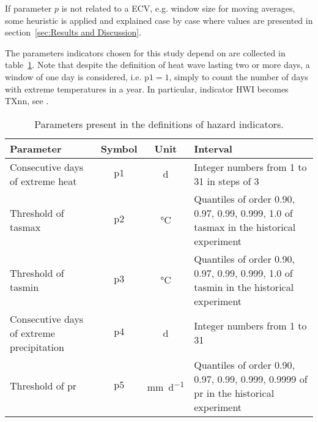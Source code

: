 If parameter $p$ is not related to a \gls{ECV}, e.g. window size for moving averages, some heuristic is applied and explained case by case where values are presented in section~\ref{sec:Results and Discussion}.

The parameters indicators chosen for this study depend on are collected in table~\ref{tab:indicators_parameters}. Note that despite the definition of heat wave lasting two or more days, a window of one day is considered, i.e. $\mathrm{p1} = 1$, simply to count the number of days with extreme temperatures in a year. In particular, indicator $\mathrm{HWI}$ becomes $\mathrm{TXnn}$, see \cite[2209]{2021GutierrezAnnexVI}.

\begin{table}[h]
  \renewcommand*{\arraystretch}{1.5}
  \centering
  \caption{Parameters present in the definitions of hazard indicators.}
  \label{tab:indicators_parameters}
  \begin{tabular}{p{}ccp{}}
    Parameter                                  & Symbol        & Unit                        & Interval                                                                                     \\
    \hline
    Consecutive days of extreme heat           & $\mathrm{p1}$ & \unit{\day}                 & Integer numbers from 1 to 31 in steps of 3                                                   \\  %
    Threshold of \gls{tasmax}                  & $\mathrm{p2}$ & \unit{\degreeCelsius}       & Quantiles of order 0.90, 0.97, 0.99, 0.999, 1.0 of \gls{tasmax} in the historical experiment \\
    Threshold of \gls{tasmin}                  & $\mathrm{p3}$ & \unit{\degreeCelsius}       & Quantiles of order 0.90, 0.97, 0.99, 0.999, 1.0 of \gls{tasmin} in the historical experiment \\
    Consecutive days of extreme precipitation  & $\mathrm{p4}$ & \unit{\day}                 & Integer numbers from 1 to 31                                                                 \\  %
    Threshold of \gls{pr}                      & $\mathrm{p5}$ & \unit{\milli\metre\per\day} & Quantiles of order 0.90, 0.97, 0.99, 0.999, 0.9999 of \gls{pr} in the historical experiment  \\
  \end{tabular}
\end{table}

